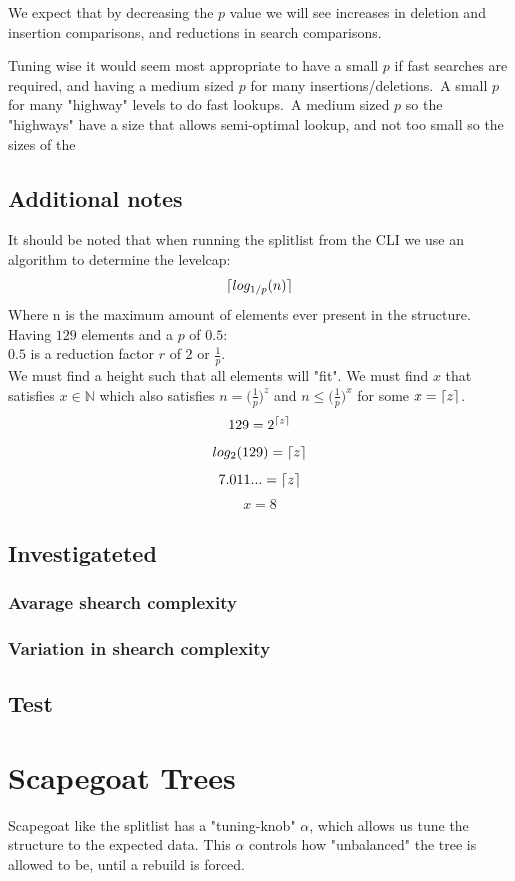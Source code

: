 \documentclass[oneside]{scrbook}
\DeclarePairedDelimiter{\ceil}{\lceil}{\rceil}
\begin{document}
We expect that by decreasing the $p$ value we will see increases in deletion and insertion comparisons, and reductions in search comparisons.

Tuning wise it would seem most appropriate to have a small $p$ if fast searches are required, and having a medium sized $p$ for many insertions/deletions.\
A small $p$ for many "highway" levels to do fast lookups.\
A medium sized $p$ so the "highways" have a size that allows semi-optimal lookup, and not too small so the sizes of the

\section*{Additional notes}
It should be noted that when running the splitlist from the CLI we use an algorithm to determine the levelcap:
$$\ceil{log_{1/p}(n)}$$
Where n is the maximum amount of elements ever present in the structure.\\
Having $129$ elements and a $p$ of $0.5$:\\
$0.5$ is a reduction factor $r$ of $2$ or $\frac{1}{p}$.\\
We must find a height such that all elements will "fit".
We must find $x$ that satisfies $x \in \mathbb{N}$ which also satisfies $n = \Big( \frac{1}{p} \Big)^{z}$ and $n \leq \Big( \frac{1}{p} \Big)^{x}$
for some $x = \ceil{z}$.
$$129 = 2^{\ceil{z}}$$
$$log_2(129) = \ceil{z}$$
$$7.011... = \ceil{z}$$
$$x = 8$$


\section{Investigateted}
\subsection{Avarage shearch complexity}
\subsection{Variation in shearch complexity}
\section{Test}
\chapter{Scapegoat Trees}
Scapegoat like the splitlist has a "tuning-knob" $\alpha$, which allows us tune the structure to the expected data.
This $\alpha$ controls how "unbalanced" the tree is allowed to be, until a rebuild is forced.
\end{document}
